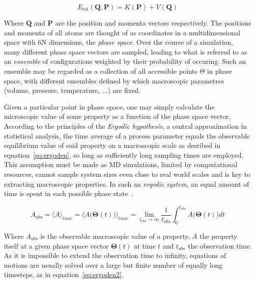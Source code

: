 \documentclass[11pt]{article}
\begin{document}
\begin{equation}
  E_{tot}(\textbf{Q}, \textbf{P}) = K(\textbf{P}) + V(\textbf{Q})
  \label{eq:total}
\end{equation}

\bigskip

\noindent Where $\textbf{Q}$ and $\textbf{P}$ are the position and momenta vectors respectively.
The positions and momenta of all atoms are thought of as coordinates in a multidimensional space with 6N dimensions, the \textit{phase space}. Over the course of a simulation, many different phase space vectors are sampled, leading to what is referred to as an \textit{ensemble} of configurations weighted by their probability of occuring. Such an ensemble may be regarded as a collection of all accessible points $\Theta$ in phase space, with different ensembles defined by which macroscopic parametres (volume, pressure, temperature,  ...) are fixed.
\\ \par \noindent
Given a particular point in phase space, one may simply calculate the microscopic value of some property as a function of the phase space vector. According to the principles of the \textit{Ergodic hypothesis}, a central approximation in statistical analysis, the time average of a process parameter equals the observable equilibrium value of said property on a macroscopic scale as desribed in equation~\ref{eq:ergoden}, so long as sufficiently long sampling times are employed. This assumption must be made as MD simulations, limited by computational resources, cannot sample system sizes even close to real world scales and is key to extracting macroscopic properties. In such an \textit{ergodic system}, an equal amount of time is spent in each possible phase state~\cite{Gupta1990-au}.

\begin{equation}
  A_{obs} = \langle A  \rangle_{time} = \bigl\langle A \bigl(\mathbf{\Theta}(t)\bigr) \bigl\rangle_{time} = \lim_{t_{obs} \to \infty} \frac{1}{t_{obs}}\int_{0}^{t_{obs}}A\bigl(\mathbf{\Theta}(t)\bigr)dt
  \label{eq:ergoden}
\end{equation}

\bigskip

\noindent Where $A_{obs}$ is the observable macroscopic value of a property, $A$ the property itself at a given phase space vector $\mathbf{\Theta}(t)$ at time $t$ and $t_{obs}$ the observation time. As it is impossible to extend the observation time to infinity, equations of motions are usually solved over a large but finite number of equally long timesteps, as in equation~\ref{eq:ergoden2}.
\end{document}
